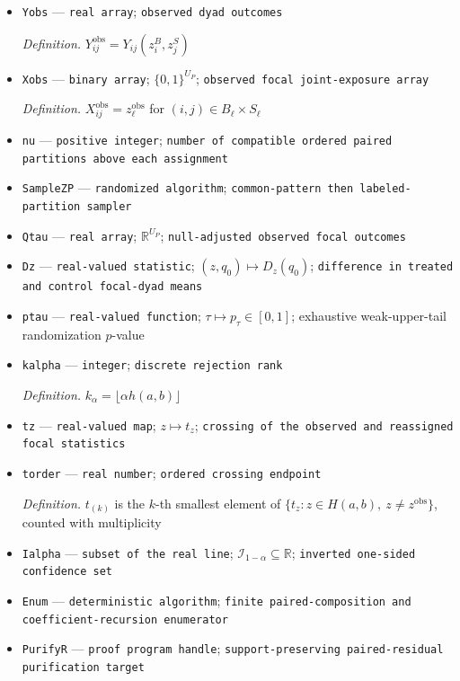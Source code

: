 \documentclass{article}
\begin{document}
\begin{itemize}
  \item \texttt{Yobs} --- \texttt{real array}; \texttt{observed dyad outcomes}
  \par\smallskip\noindent\emph{Definition.} \(Y_{ij}^{\mathrm{obs}}=Y_{ij}(z_i^B,z_j^S)\)
  \item \texttt{Xobs} --- \texttt{binary array}; \(\{0,1\}^{U_P}\); \texttt{observed focal joint-\allowbreak{}exposure array}
  \par\smallskip\noindent\emph{Definition.} \(X_{ij}^{\mathrm{obs}}=z_\ell^{\mathrm{obs}}\) for \((i,j)\in B_\ell\times S_\ell\)
  \item \texttt{nu} --- \texttt{positive integer}; \texttt{number of compatible ordered paired partitions above each assignment}
  \item \texttt{SampleZP} --- \texttt{randomized algorithm}; \texttt{common-\allowbreak{}pattern then labeled-\allowbreak{}partition sampler}
  \item \texttt{Qtau} --- \texttt{real array}; \(\mathbb R^{U_P}\); \texttt{null-\allowbreak{}adjusted observed focal outcomes}
  \item \texttt{Dz} --- \texttt{real-\allowbreak{}valued statistic}; \((z,q_0)\mapsto D_z(q_0)\); \texttt{difference in treated and control focal-\allowbreak{}dyad means}
  \item \texttt{ptau} --- \texttt{real-\allowbreak{}valued function}; \(\tau\mapsto p_\tau\in[0,1]\); exhaustive weak-upper-tail randomization \(p\)-value
  \item \texttt{kalpha} --- \texttt{integer}; \texttt{discrete rejection rank}
  \par\smallskip\noindent\emph{Definition.} \(k_\alpha=\lfloor\alpha h(a,b)\rfloor\)
  \item \texttt{tz} --- \texttt{real-\allowbreak{}valued map}; \(z\mapsto t_z\); \texttt{crossing of the observed and reassigned focal statistics}
  \item \texttt{torder} --- \texttt{real number}; \texttt{ordered crossing endpoint}
  \par\smallskip\noindent\emph{Definition.} \(t_{(k)}\) is the \(k\)-th smallest element of \(\{t_z:z\in H(a,b),\ z\ne z^{\mathrm{obs}}\}\), counted with multiplicity
  \item \texttt{Ialpha} --- \texttt{subset of the real line}; \(\mathcal I_{1-\alpha}\subseteq\mathbb R\); \texttt{inverted one-\allowbreak{}sided confidence set}
  \item \texttt{Enum} --- \texttt{deterministic algorithm}; \texttt{finite paired-\allowbreak{}composition and coefficient-\allowbreak{}recursion enumerator}
  \item \texttt{PurifyR} --- \texttt{proof program handle}; \texttt{support-\allowbreak{}preserving paired-\allowbreak{}residual purification target}
\end{itemize}
\end{document}
